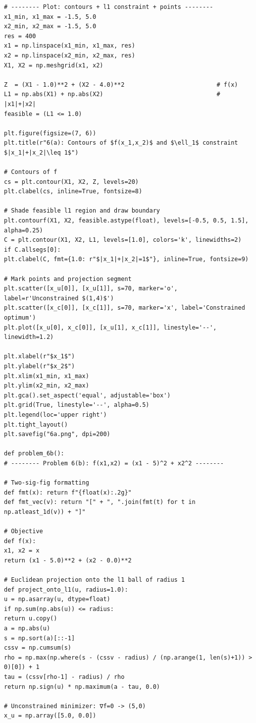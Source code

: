 \documentclass[11pt]{article}
\begin{document}
\begin{lstlisting}
# -------- Plot: contours + l1 constraint + points --------
x1_min, x1_max = -1.5, 5.0
x2_min, x2_max = -1.5, 5.0
res = 400
x1 = np.linspace(x1_min, x1_max, res)
x2 = np.linspace(x2_min, x2_max, res)
X1, X2 = np.meshgrid(x1, x2)

Z  = (X1 - 1.0)**2 + (X2 - 4.0)**2                          # f(x)
L1 = np.abs(X1) + np.abs(X2)                                # |x1|+|x2|
feasible = (L1 <= 1.0)

plt.figure(figsize=(7, 6))
plt.title(r"6(a): Contours of $f(x_1,x_2)$ and $\ell_1$ constraint $|x_1|+|x_2|\leq 1$")

# Contours of f
cs = plt.contour(X1, X2, Z, levels=20)
plt.clabel(cs, inline=True, fontsize=8)

# Shade feasible l1 region and draw boundary
plt.contourf(X1, X2, feasible.astype(float), levels=[-0.5, 0.5, 1.5], alpha=0.25)
C = plt.contour(X1, X2, L1, levels=[1.0], colors='k', linewidths=2)
if C.allsegs[0]:
plt.clabel(C, fmt={1.0: r"$|x_1|+|x_2|=1$"}, inline=True, fontsize=9)

# Mark points and projection segment
plt.scatter([x_u[0]], [x_u[1]], s=70, marker='o', label=r'Unconstrained $(1,4)$')
plt.scatter([x_c[0]], [x_c[1]], s=70, marker='x', label='Constrained optimum')
plt.plot([x_u[0], x_c[0]], [x_u[1], x_c[1]], linestyle='--', linewidth=1.2)

plt.xlabel(r"$x_1$")
plt.ylabel(r"$x_2$")
plt.xlim(x1_min, x1_max)
plt.ylim(x2_min, x2_max)
plt.gca().set_aspect('equal', adjustable='box')
plt.grid(True, linestyle='--', alpha=0.5)
plt.legend(loc='upper right')
plt.tight_layout()
plt.savefig("6a.png", dpi=200)

def problem_6b():
# -------- Problem 6(b): f(x1,x2) = (x1 - 5)^2 + x2^2 --------

# Two-sig-fig formatting
def fmt(x): return f"{float(x):.2g}"
def fmt_vec(v): return "[" + ", ".join(fmt(t) for t in np.atleast_1d(v)) + "]"

# Objective
def f(x):
x1, x2 = x
return (x1 - 5.0)**2 + (x2 - 0.0)**2

# Euclidean projection onto the l1 ball of radius 1
def project_onto_l1(u, radius=1.0):
u = np.asarray(u, dtype=float)
if np.sum(np.abs(u)) <= radius:
return u.copy()
a = np.abs(u)
s = np.sort(a)[::-1]
cssv = np.cumsum(s)
rho = np.max(np.where(s - (cssv - radius) / (np.arange(1, len(s)+1)) > 0)[0]) + 1
tau = (cssv[rho-1] - radius) / rho
return np.sign(u) * np.maximum(a - tau, 0.0)

# Unconstrained minimizer: ∇f=0 -> (5,0)
x_u = np.array([5.0, 0.0])


\end{lstlisting}
\end{document}
